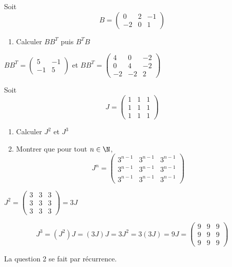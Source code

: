 \documentclass[a4paper, 11pt,reqno]{article}
\begin{document}
\begin{exercice}
Soit $$B=\left(\begin{array}{rrr} 0&2&-1\\-2&0&1 \end{array}\right)$$
\begin{enumerate}
\item Calculer $BB^T$ puis $B^T B$
\end{enumerate}
\end{exercice}
\begin{correction}
$BB^T=\left(\begin{array}{rrr} 5&-1\\-1&5 \end{array}\right)$ et 
$BB^T=\left(\begin{array}{rrr} 4&0&-2\\0&4&-2\\-2&-2&2 \end{array}\right)$
\end{correction}


\begin{exercice}
Soit $$J=\left(\begin{array}{rrr} 1&1&1\\1&1&1 \\1&1&1 \end{array}\right)$$
\begin{enumerate}
\item Calculer $J^2$ et $J^3$
\item Montrer que pour tout $n\in \N$, $$J^n =\left(\begin{array}{rrr} 3^{n-1}&3^{n-1}&3^{n-1}\\3^{n-1}&3^{n-1}&3^{n-1} \\3^{n-1}&3^{n-1}&3^{n-1} \end{array}\right)$$
\end{enumerate}
\end{exercice}
\begin{correction}
 $J^2=\left(\begin{array}{rrr} 3&3&3\\3&3&3 \\3&3&3 \end{array}\right)=3J$
 
$$J^3 = (J^2)J= (3J) J = 3J^2 = 3(3J) = 9J =\left(\begin{array}{rrr} 9&9&9\\9&9&9 \\9&9&9 \end{array}\right)$$  

La question 2 se fait par récurrence. 
\end{correction}
\end{document}
